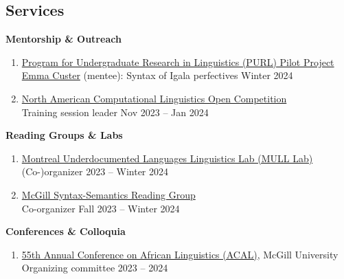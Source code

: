 \documentclass[margin,line]{resume}
\begin{document}
\begin{resume}
\begin{comment}
	\vspace{-0.6em}\rule{\textwidth}{0.4pt}
	\end{comment}


	\section{\mysidestyle Services}


	\textbf{Mentorship \& Outreach}
	\begin{enumerate}[-, leftmargin=1em, topsep=4pt]
		\item[] \href{https://www.mcgill.ca/cogsci/research/cogs396}{Program for Undergraduate Research in Linguistics (PURL) Pilot Project}\\
		      \hphantom{...}\href{https://www.linkedin.com/in/emma-custer-648345252}{Emma Custer} (mentee): Syntax of Igala perfectives \hfill Winter 2024

		\item[] \href{https://naclo.org/}{North American Computational Linguistics Open Competition}\\
		      \hphantom{...}Training session leader \hfill Nov 2023 -- Jan 2024
	\end{enumerate}

	\textbf{Reading Groups \& Labs}
	\begin{enumerate}[-, leftmargin=1em, topsep=4pt]
		\item[] \href{https://mcling.blogs.mcgill.ca/category/mull-lab/}{Montreal Underdocumented Languages Linguistics Lab (MULL Lab)}\\
		      \hphantom{...}(Co-)organizer \hfill 2023 -- Winter 2024

		\item[] \href{https://mcling.blogs.mcgill.ca/category/syntax-semantics-group/}{McGill Syntax-Semantics Reading Group}\\
		      \hphantom{...}Co-organizer \hfill Fall 2023 -- Winter 2024
	\end{enumerate}

	\textbf{Conferences \& Colloquia}
	\begin{enumerate}[-, leftmargin=1em, topsep=4pt]
		\item[] \href{https://acal55.mull-lab.org/}{55th Annual Conference on African Linguistics (ACAL)}, McGill University\\
		      \hphantom{...}Organizing committee \hfill 2023 -- 2024


\end{enumerate}
\end{resume}
\end{document}
